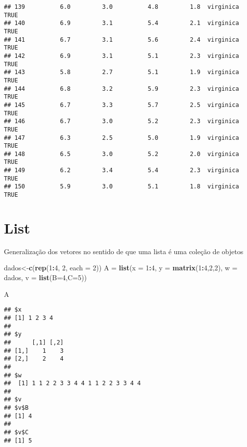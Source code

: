 \documentclass[]{article}
\newenvironment{Shaded}{\begin{snugshade}}{\end{snugshade}}
\newcommand{\KeywordTok}[1]{\textcolor[rgb]{0.13,0.29,0.53}{\textbf{#1}}}
\newcommand{\DataTypeTok}[1]{\textcolor[rgb]{0.13,0.29,0.53}{#1}}
\newcommand{\DecValTok}[1]{\textcolor[rgb]{0.00,0.00,0.81}{#1}}
\newcommand{\StringTok}[1]{\textcolor[rgb]{0.31,0.60,0.02}{#1}}
\newcommand{\OperatorTok}[1]{\textcolor[rgb]{0.81,0.36,0.00}{\textbf{#1}}}
\newcommand{\NormalTok}[1]{#1}
\begin{document}
\begin{verbatim}
## 139          6.0         3.0          4.8         1.8  virginica   TRUE
## 140          6.9         3.1          5.4         2.1  virginica   TRUE
## 141          6.7         3.1          5.6         2.4  virginica   TRUE
## 142          6.9         3.1          5.1         2.3  virginica   TRUE
## 143          5.8         2.7          5.1         1.9  virginica   TRUE
## 144          6.8         3.2          5.9         2.3  virginica   TRUE
## 145          6.7         3.3          5.7         2.5  virginica   TRUE
## 146          6.7         3.0          5.2         2.3  virginica   TRUE
## 147          6.3         2.5          5.0         1.9  virginica   TRUE
## 148          6.5         3.0          5.2         2.0  virginica   TRUE
## 149          6.2         3.4          5.4         2.3  virginica   TRUE
## 150          5.9         3.0          5.1         1.8  virginica   TRUE
\end{verbatim}

\section{List}\label{list}

Generalização dos vetores no sentido de que uma lista é uma coleção de
objetos

\begin{Shaded}
\begin{Highlighting}[]
\NormalTok{dados<-}\KeywordTok{c}\NormalTok{(}\KeywordTok{rep}\NormalTok{(}\DecValTok{1}\OperatorTok{:}\DecValTok{4}\NormalTok{, }\DecValTok{2}\NormalTok{, }\DataTypeTok{each =} \DecValTok{2}\NormalTok{))}
\NormalTok{A =}\StringTok{ }\KeywordTok{list}\NormalTok{(}\DataTypeTok{x =} \DecValTok{1}\OperatorTok{:}\DecValTok{4}\NormalTok{, }\DataTypeTok{y =} \KeywordTok{matrix}\NormalTok{(}\DecValTok{1}\OperatorTok{:}\DecValTok{4}\NormalTok{,}\DecValTok{2}\NormalTok{,}\DecValTok{2}\NormalTok{), }\DataTypeTok{w =}\NormalTok{ dados, }\DataTypeTok{v =} \KeywordTok{list}\NormalTok{(}\DataTypeTok{B=}\DecValTok{4}\NormalTok{,}\DataTypeTok{C=}\DecValTok{5}\NormalTok{))}

\NormalTok{A}
\end{Highlighting}
\end{Shaded}

\begin{verbatim}
## $x
## [1] 1 2 3 4
## 
## $y
##      [,1] [,2]
## [1,]    1    3
## [2,]    2    4
## 
## $w
##  [1] 1 1 2 2 3 3 4 4 1 1 2 2 3 3 4 4
## 
## $v
## $v$B
## [1] 4
## 
## $v$C
## [1] 5
\end{verbatim}
\end{document}
